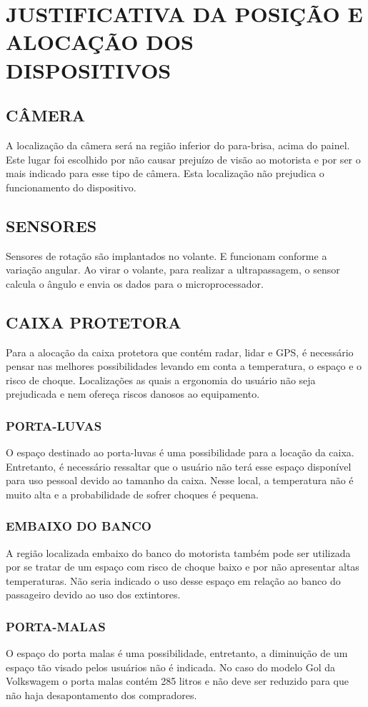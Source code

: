 \chapter[JUSTIFICATIVA DA POSIÇÃO E ALOCAÇÃO DOS DISPOSITIVOS]{JUSTIFICATIVA DA POSIÇÃO E ALOCAÇÃO DOS DISPOSITIVOS}

\section{CÂMERA}
A localização da câmera será na região inferior do para-brisa, acima do painel. Este lugar foi escolhido por não causar prejuízo de visão ao motorista e por ser o mais indicado para esse tipo de câmera. Esta localização não prejudica o funcionamento do dispositivo.
\section{SENSORES}
Sensores de rotação são implantados no volante. E funcionam conforme a variação angular. Ao virar o volante, para realizar a ultrapassagem, o sensor calcula o ângulo e envia os dados para o microprocessador.
\section{CAIXA PROTETORA}
Para a alocação da caixa protetora que contém radar, lidar e GPS, é necessário pensar nas melhores possibilidades levando em conta a temperatura, o espaço e o risco de choque. Localizações as quais a ergonomia do usuário não seja prejudicada e nem ofereça riscos danosos ao equipamento.
\subsection{PORTA-LUVAS}
O espaço destinado ao porta-luvas é uma possibilidade para a locação da caixa. Entretanto, é necessário ressaltar que o usuário não terá esse espaço disponível para uso pessoal devido ao tamanho da caixa. Nesse local, a temperatura não é muito alta e a probabilidade de sofrer choques é pequena.
\subsection{EMBAIXO DO BANCO}
A região localizada embaixo do banco do motorista também pode ser utilizada por se tratar de um espaço com risco de choque baixo e por não apresentar altas temperaturas. Não seria indicado o uso desse espaço em relação ao banco do passageiro devido ao uso dos extintores.
\subsection{PORTA-MALAS}
O espaço do porta malas é uma possibilidade, entretanto, a diminuição de um espaço tão visado pelos usuários não é indicada. No caso do modelo Gol da Volkswagem o porta malas contém 285 litros e não deve ser reduzido para que não haja desapontamento dos compradores.
